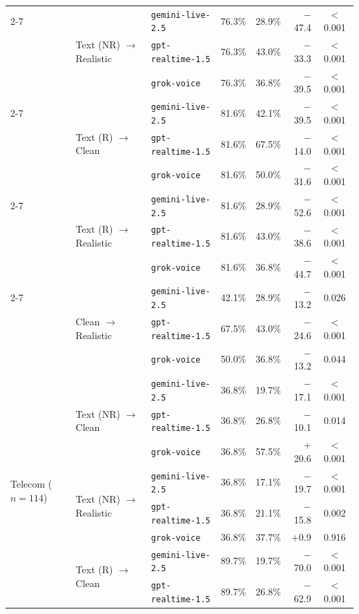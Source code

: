 \begin{tabular}{lllrrrc}
\cmidrule(l){2-7}
 & \multirow{3}{*}{Text (NR) $\to$ Realistic} & {\texttt{gemini-live-2.5}} & 76.3\% & 28.9\% & $-$47.4 & $<$0.001 \\
 &  & {\texttt{gpt-realtime-1.5}} & 76.3\% & 43.0\% & $-$33.3 & $<$0.001 \\
 &  & {\texttt{grok-voice}} & 76.3\% & 36.8\% & $-$39.5 & $<$0.001 \\
\cmidrule(l){2-7}
 & \multirow{3}{*}{Text (R) $\to$ Clean} & {\texttt{gemini-live-2.5}} & 81.6\% & 42.1\% & $-$39.5 & $<$0.001 \\
 &  & {\texttt{gpt-realtime-1.5}} & 81.6\% & 67.5\% & $-$14.0 & $<$0.001 \\
 &  & {\texttt{grok-voice}} & 81.6\% & 50.0\% & $-$31.6 & $<$0.001 \\
\cmidrule(l){2-7}
 & \multirow{3}{*}{Text (R) $\to$ Realistic} & {\texttt{gemini-live-2.5}} & 81.6\% & 28.9\% & $-$52.6 & $<$0.001 \\
 &  & {\texttt{gpt-realtime-1.5}} & 81.6\% & 43.0\% & $-$38.6 & $<$0.001 \\
 &  & {\texttt{grok-voice}} & 81.6\% & 36.8\% & $-$44.7 & $<$0.001 \\
\cmidrule(l){2-7}
 & \multirow{3}{*}{Clean $\to$ Realistic} & {\texttt{gemini-live-2.5}} & 42.1\% & 28.9\% & $-$13.2 & 0.026 \\
 &  & {\texttt{gpt-realtime-1.5}} & 67.5\% & 43.0\% & $-$24.6 & $<$0.001 \\
 &  & {\texttt{grok-voice}} & 50.0\% & 36.8\% & $-$13.2 & 0.044 \\
\midrule
\multirow{15}{*}{Telecom ($n=114$)}
 & \multirow{3}{*}{Text (NR) $\to$ Clean} & {\texttt{gemini-live-2.5}} & 36.8\% & 19.7\% & $-$17.1 & $<$0.001 \\
 &  & {\texttt{gpt-realtime-1.5}} & 36.8\% & 26.8\% & $-$10.1 & 0.014 \\
 &  & {\texttt{grok-voice}} & 36.8\% & 57.5\% & $+$20.6 & $<$0.001 \\
\cmidrule(l){2-7}
 & \multirow{3}{*}{Text (NR) $\to$ Realistic} & {\texttt{gemini-live-2.5}} & 36.8\% & 17.1\% & $-$19.7 & $<$0.001 \\
 &  & {\texttt{gpt-realtime-1.5}} & 36.8\% & 21.1\% & $-$15.8 & 0.002 \\
 &  & {\texttt{grok-voice}} & 36.8\% & 37.7\% & $+$0.9 & 0.916 \\
\cmidrule(l){2-7}
 & \multirow{3}{*}{Text (R) $\to$ Clean} & {\texttt{gemini-live-2.5}} & 89.7\% & 19.7\% & $-$70.0 & $<$0.001 \\
 &  & {\texttt{gpt-realtime-1.5}} & 89.7\% & 26.8\% & $-$62.9 & $<$0.001 \\

\end{tabular}
